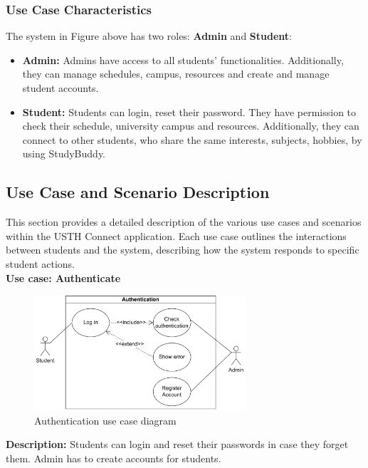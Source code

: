 \documentclass[12pt]{article}
\begin{document}
\subsubsection{Use Case Characteristics}
    The system in Figure above has two roles: \textbf{Admin} and \textbf{Student}:
    \begin{itemize}
        \item \textbf{Admin:} Admins have access to all students' functionalities. 
        Additionally, they can manage schedules, campus, resources and create and manage student accounts.
        \item \textbf{Student:}  Students can login, reset their password. They have permission to check their schedule, university campus and resources. Additionally, they can connect to other students, who share the same interests, subjects, hobbies,  by using StudyBuddy.
    \end{itemize}

\subsection{Use Case and Scenario Description}
    This section provides a detailed description of the various use cases and scenarios within the USTH Connect application. 
    Each use case outlines the interactions between students and the system, describing how the system responds to specific student actions. \\
    
\textbf{Use case: Authenticate} \\

    \begin{figure}[H]
        \centering
        \includegraphics[width=0.7\textwidth]{image/AuthenticationUseCase.pdf} 
        \caption{Authentication use case diagram}
        \label{fig:authenticate_use_case}
    \end{figure}
    \textbf{Description:} Students can login and reset their passwords in case they forget them. Admin has to create accounts for students. \\
\end{document}
